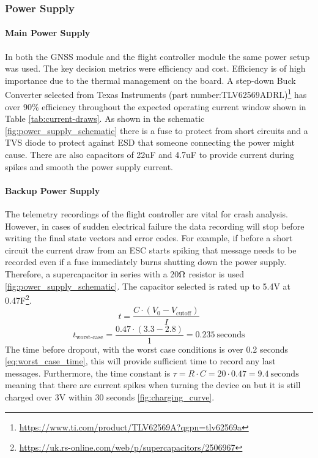 \subsubsection{Power Supply}\label{sub_sub_section:tgt_power_supply}

\paragraph{Main Power Supply}
In both the GNSS module and the flight controller module the same power setup was used. The key decision metrics were efficiency and cost.  Efficiency is of high importance due to the thermal management on the board. A step-down Buck Converter selected from Texas Instruments (part number:TLV62569ADRL)\footnote{\url{https://www.ti.com/product/TLV62569A?qgpn=tlv62569a}} has over 90\% efficiency throughout the expected operating current window shown in Table \ref{tab:current-draws}. As shown in the schematic \ref{fig:power_supply_schematic} there is a fuse to protect from short circuits and a \gls{TVS} diode to protect against \gls{ESD} that someone connecting the power might cause. There are also capacitors of 22uF and 4.7uF to provide current during spikes and smooth the power supply current.

\paragraph{Backup Power Supply}
The telemetry recordings of the flight controller are vital for crash analysis. However, in cases of sudden electrical failure the data recording will stop before writing the final state vectors and error codes. For example, if before a short circuit the current draw from an \gls{ESC} starts spiking that message needs to be recorded even if a fuse immediately burns shutting down the power supply. Therefore, a supercapacitor in series with a 20$\ohm$ resistor is used \ref{fig:power_supply_schematic}. The capacitor selected is rated up to 5.4V at 0.47F\footnote{\url{https://uk.rs-online.com/web/p/supercapacitors/2506967}}. 
\begin{equation}
t = \frac{C \cdot (V_0 - V_{\text{cutoff}})}{I}
\label{eq:discharge_time}
\end{equation}
\begin{equation}
t_{\text{worst-case}} = \frac{0.47 \cdot (3.3 - 2.8)}{1} = 0.235\ \text{seconds}
\label{eq:worst_case_time}
\end{equation}
The time before dropout, with the worst case conditions is over 0.2 seconds \ref{eq:worst_case_time}, this will provide sufficient time to record any last messages. Furthermore, the time constant is $\tau = R \cdot C = 20 \cdot 0.47 = 9.4\ \text{seconds}$ meaning that there are current spikes when turning the device on but it is still charged over 3V within 30 seconds \ref{fig:charging_curve}.


